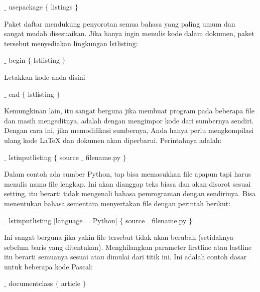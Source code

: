 $ \_ $  usepackage  $ \{ $ listings $ \} $

\vspace{12pt}
\hspace{0.50in}Paket daftar mendukung penyorotan semua bahasa yang paling umum dan sangat mudah disesuaikan. Jika hanya ingin menulis kode dalam dokumen, paket tersebut menyediakan lingkungan lstlisting: \par
$ \_ $  begin  $ \{ $ lstlisting $ \} $ \par

Letakkan kode anda disini  \par 
 
$ \_ $ end  $ \{ $ lstlisting $ \} $ \par
 
\vspace{12pt}
\hspace{0.50in} Kemungkinan lain, itu sangat berguna jika membuat program pada beberapa file dan masih mengeditnya, adalah dengan mengimpor kode dari sumbernya sendiri. Dengan cara ini, jika memodifikasi sumbernya, Anda hanya perlu mengkompilasi ulang kode LaTeX dan dokumen akan diperbarui. Perintahnya adalah: \par
$ \_ $  lstinputlisting  $ \{ $ source $ \_ $ filename.py $ \} $ \par

\vspace{12pt}
\hspace{0.50in} Dalam contoh ada sumber Python, tap bisa memasukkan file apapun tapi harus menulis nama file lengkap. Ini akan dianggap teks biasa dan akan disorot sesuai setting, itu berarti tidak mengenali bahasa pemrograman dengan sendirinya. Bisa menentukan bahasa sementara menyertakan file dengan perintah berikut: \par

 $ \_ $  lstinputlisting [language = Python]  $ \{ $ source $ \_ $ filename.py $ \} $ \par

\vspace{12pt}
\hspace{0.50in} Ini sangat berguna jika yakin file tersebut tidak akan berubah (setidaknya sebelum baris yang ditentukan). Menghilangkan parameter firstline atau lastline itu berarti semuanya sesuai atau dimulai dari titik ini. Ini adalah contoh dasar untuk beberapa kode Pascal:\par


\noindent  $ \_ $ documentclass $ \{ $ article $ \} $ \par


